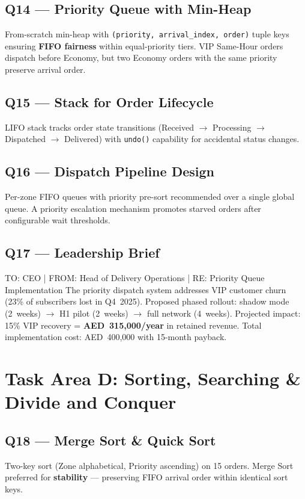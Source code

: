 \documentclass[12pt,a4paper]{article}
\begin{document}
\subsection{Q14 --- Priority Queue with Min-Heap}
From-scratch min-heap with \texttt{(priority, arrival\_index, order)} tuple keys ensuring \textbf{FIFO fairness} within equal-priority tiers. VIP Same-Hour orders dispatch before Economy, but two Economy orders with the same priority preserve arrival order.

\subsection{Q15 --- Stack for Order Lifecycle}
LIFO stack tracks order state transitions (Received $\rightarrow$ Processing $\rightarrow$ Dispatched $\rightarrow$ Delivered) with \texttt{undo()} capability for accidental status changes.

\subsection{Q16 --- Dispatch Pipeline Design}
Per-zone FIFO queues with priority pre-sort recommended over a single global queue. A priority escalation mechanism promotes starved orders after configurable wait thresholds.

\subsection{Q17 --- Leadership Brief}

\begin{memobox}{TO: CEO | FROM: Head of Delivery Operations | RE: Priority Queue Implementation}
The priority dispatch system addresses VIP customer churn (23\% of subscribers lost in Q4~2025). Proposed phased rollout: shadow mode (2~weeks) $\rightarrow$ H1 pilot (2~weeks) $\rightarrow$ full network (4~weeks). Projected impact: 15\% VIP recovery = \textbf{AED~315{,}000/year} in retained revenue. Total implementation cost: AED~400{,}000 with 15-month payback.
\end{memobox}

\newpage
\section{Task Area D: Sorting, Searching \& Divide and Conquer}

\subsection{Q18 --- Merge Sort \& Quick Sort}
Two-key sort (Zone alphabetical, Priority ascending) on 15 orders. Merge Sort preferred for \textbf{stability} --- preserving FIFO arrival order within identical sort keys.
\end{document}
